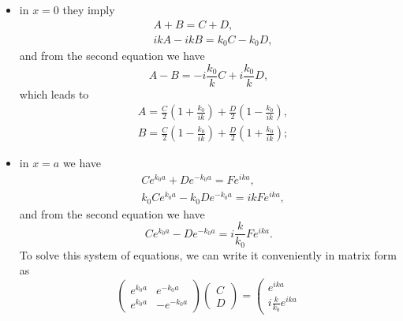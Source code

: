 \begin{itemize}
    \item in \(x = 0\) they imply
    \begin{equation*}
    \begin{split}
        & A+B = C+D,\\
        & ikA - ikB = k_0C -k_0D,
    \end{split}
    \end{equation*}
    and from the second equation we have
    \begin{equation*}
        A-B = -i\frac{k_0}{k}C + i\frac{k_0}{k}D,
    \end{equation*}
    which leads to
    \begin{equation*}
        \begin{split}
            & A = \frac{C}{2}\left(1+\frac{k_0}{ik}\right) + \frac{D}{2}\left(1-\frac{k_0}{ik}\right), \\
            & B = \frac{C}{2}\left(1-\frac{k_0}{ik}\right) + \frac{D}{2}\left(1+\frac{k_0}{ik}\right);
        \end{split}
    \end{equation*}
    \item in \(x = a\) we have
    \begin{equation*}
        \begin{split}
            & C e^{k_0a}+ De^{-k_0a} = Fe^{ika},\\
            & k_0Ce^{k_0a}-k_0De^{-k_0a} = ikFe^{ika},
        \end{split}
    \end{equation*}
    and from the second equation we have \begin{equation}
        Ce^{k_0a} - De^{-k_0a} = i\frac{k}{k_0} F e^{ika}.
    \end{equation}
    To solve this system of equations, we can write it conveniently in matrix form as
    \begin{equation*}
        \left( \begin{array}{cc}
        e^{k_0a} & e^{-k_0a} \\
        e^{k_0a} & -e^{-k_0a}
        \end{array} \right) 
        \left(\begin{array}{c}
        C \\
        D
        \end{array} \right) = 
        \left( \begin{array}{c}
        e^{ika} \\
        i\frac{k}{k_0}e^{ika}

\end{array}
\end{equation*}
\end{itemize}
